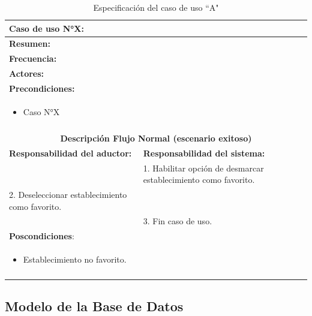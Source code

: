 \begin{table}[H]
    \centering
    \caption{Especificaci\'on del caso de uso ``A"}
    \begin{tabularx}{\textwidth}{|X|X|}
        \hline
        \multicolumn{2}{|l|}{\textbf{Caso de uso N°X:} }\\\hline
        \multicolumn{2}{|l|}{\textbf{Resumen:} }\\\hline
        \multicolumn{2}{|l|}{\textbf{Frecuencia:} }\\\hline
        \multicolumn{2}{|l|}{\textbf{Actores:} }\\\hline
        \multicolumn{2}{|l|}{\textbf{Precondiciones:}}\\
        \multicolumn{2}{|l|}{\begin{minipage}[t]{0.8\textwidth}
        \begin{itemize}
            \item Caso N°X
        \end{itemize}
        \end{minipage}}\\
        \multicolumn{2}{|l|}{}\\\hline
        \multicolumn{2}{|c|}{\textbf{Descripci\'on Flujo Normal (escenario exitoso)}}\\\hline
        \textbf{Responsabilidad del aductor:} & \textbf{Responsabilidad del sistema:}\\ \hline
        &1. Habilitar opción de desmarcar establecimiento como favorito.\\
        2. Deseleccionar establecimiento como favorito.&\\
        &3. Fin caso de uso.\\\hline
        \multicolumn{2}{|l|}{\textbf{Poscondiciones}:}\\
        \multicolumn{2}{|l|}{\begin{minipage}[t]{0,4\textwidth}
        \begin{itemize}
            \item Establecimiento no favorito.
        \end{itemize}
        \end{minipage}}\\
        \multicolumn{2}{|l|}{}\\\hline        
    \end{tabularx}
    \label{usecase5}
\end{table}

\subsection{Modelo de la Base de Datos}



